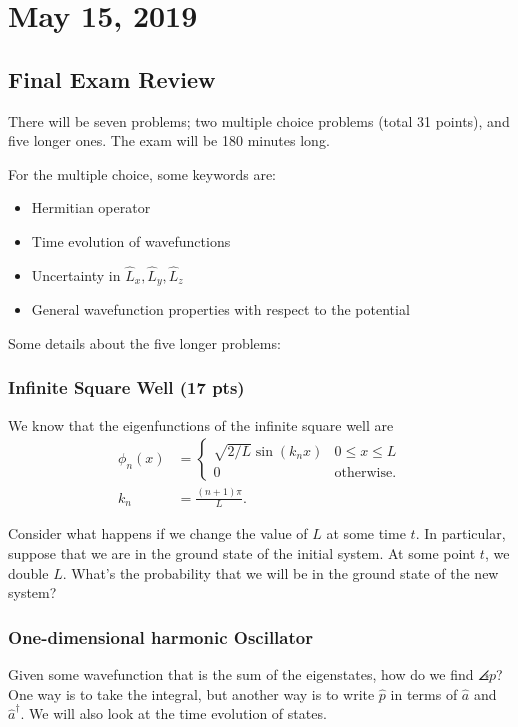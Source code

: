 \documentclass{scrartcl}
\begin{document}
\section{May 15, 2019}
\subsection{Final Exam Review}
There will be seven problems; two multiple choice problems (total 31 points), and five longer ones. The exam will be 180 minutes long.

For the multiple choice, some keywords are:
\begin{itemize}
	\item Hermitian operator
	\item Time evolution of wavefunctions
	\item Uncertainty in \(\hat L_x, \hat L_y, \hat L_z\)
	\item General wavefunction properties with respect to the potential
\end{itemize}

Some details about the five longer problems:
\subsubsection{Infinite Square Well (17 pts)}
We know that the eigenfunctions of the infinite square well are
\begin{align*}
	\phi_n(x) &= \begin{cases}
		\sqrt{2/L} \sin(k_n x) & 0 \leq x \leq L \\
		0 & \text{otherwise}.
	\end{cases} \\
	k_n &= \frac{(n + 1)\pi}{L}.
\end{align*}

Consider what happens if we change the value of \(L\) at some time \(t\). In particular, suppose that we are in the ground state of the initial system. At some point \(t\), we double \(L\). What's the probability that we will be in the ground state of the new system?

\subsubsection{One-dimensional harmonic Oscillator}
Given some wavefunction that is the sum of the eigenstates, how do we find \(\angles p\)? One way is to take the integral, but another way is to write \(\hat p\) in terms of \(\hat a\) and \(\hat a^\dagger\). We will also look at the time evolution of states.
\end{document}
